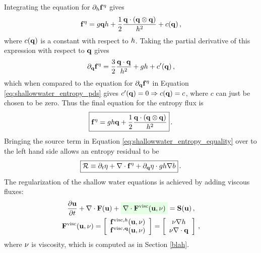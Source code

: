 Integrating the equation for $\partial_h\mathbf{f}^\eta$
gives
\begin{equation}
  \mathbf{f}^\eta
  = g\mathbf{q}h
  + \frac{1}{2}\frac{\mathbf{q}\cdot\left(\mathbf{q}\otimes\mathbf{q}\right)} 
  {h^2}
  + c(\mathbf{q}) \,,
\end{equation}
where $c(\mathbf{q})$ is a constant with respect to $h$. Taking
the partial derivative of this expression with respect to $\mathbf{q}$
gives
\begin{equation}
  \partial_{\mathbf{q}}\mathbf{f}^\eta
  = \frac{3}{2}\frac{\mathbf{q}\cdot\mathbf{q}}{h^2}
  + gh + c'(\mathbf{q}) \,,
\end{equation}
which when compared to the equation for 
$\partial_{\mathbf{q}}\mathbf{f}^\eta$ in Equation
\eqref{eq:shallowwater_entropy_pds} gives
$c'(\mathbf{q})=0\Rightarrow c(\mathbf{q})=c$, where
$c$ can just be chosen to be zero. Thus the final equation for the
entropy flux is
\begin{equation}
  \boxed{
  \mathbf{f}^\eta
  = gh\mathbf{q}
  + \frac{1}{2}\frac{\mathbf{q}\cdot\left(\mathbf{q}\otimes\mathbf{q}\right)} 
  {h^2}
  } \,.
\end{equation}
Bringing the source term in Equation \eqref{eq:shallowwater_entropy_equality}
over to the left hand side allows an entropy residual to be 
\begin{equation}
  \boxed{
  \mathcal{R} \equiv \partial_t\eta
  + \nabla\cdot\mathbf{f}^\eta
  + \partial_{\mathbf{q}}\eta\cdot gh\nabla b
  } \,.
\end{equation}
The regularization of the shallow water equations is achieved by adding
viscous fluxes:
\begin{equation}
\begin{gathered}
  \ppt{\vectorsolution} + \nabla\cdot\consfluxvector
  + \highlightgreen{\nabla\cdot\viscconsfluxvector}
  = \conssource \eqc
\\
  \viscconsfluxvector
  = \left[\begin{array}{c}
    \viscflux{\height}(\vectorsolution,\viscosity)\\
    \viscflux{\heightmomentum}(\vectorsolution,\viscosity)
    \end{array}\right]
  = \left[\begin{array}{c}
    \viscosity\nabla\height\\
    \viscosity\divergence\heightmomentum
    \end{array}\right] \eqc
\end{gathered}
\end{equation}
where $\nu$ is viscosity, which is computed as in Section \ref{blah}.
